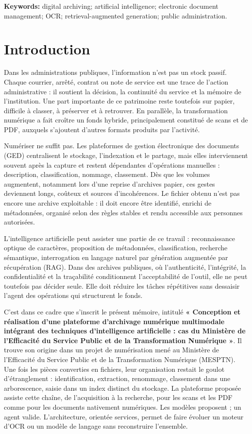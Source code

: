 \documentclass[12pt,a4paper]{report}
\newcommand{\rapportTitre}{Conception et réalisation d'une plateforme d'archivage numérique multimodale intégrant des techniques d'intelligence artificielle : cas du Ministère de l'Efficacité du Service Public et de la Transformation Numérique}
\newcommand{\nomMinistere}{Ministère de l'Efficacité du Service Public et de la Transformation Numérique (MESPTN)}
\begin{document}
\noindent\textbf{Keywords:} digital archiving; artificial intelligence; electronic document management; OCR; retrieval-augmented generation; public administration.
\endgroup

\clearpage
\tableofcontents
\clearpage

\pagestyle{fancy}

\chapter*{Introduction}
Dans les administrations publiques, l'information n'est pas un stock passif. Chaque courrier, arrêté, contrat ou note de service est une trace de l'action administrative : il soutient la décision, la continuité du service et la mémoire de l'institution. Une part importante de ce patrimoine reste toutefois sur papier, difficile à classer, à préserver et à retrouver. En parallèle, la transformation numérique a fait croître un fonds hybride, principalement constitué de scans et de PDF, auxquels s'ajoutent d'autres formats produits par l'activité.

Numériser ne suffit pas. Les plateformes de gestion électronique des documents (GED) centralisent le stockage, l'indexation et le partage, mais elles interviennent souvent après la capture et restent dépendantes d'opérations manuelles : description, classification, nommage, classement. Dès que les volumes augmentent, notamment lors d'une reprise d'archives papier, ces gestes deviennent longs, coûteux et sources d'incohérences. Le fichier obtenu n'est pas encore une archive exploitable : il doit encore être identifié, enrichi de métadonnées, organisé selon des règles stables et rendu accessible aux personnes autorisées.

L'intelligence artificielle peut assister une partie de ce travail : reconnaissance optique de caractères, proposition de métadonnées, classification, recherche sémantique, interrogation en langage naturel par génération augmentée par récupération (RAG). Dans des archives publiques, où l'authenticité, l'intégrité, la confidentialité et la traçabilité conditionnent l'acceptabilité de l'outil, elle ne peut toutefois pas décider seule. Elle doit réduire les tâches répétitives sans dessaisir l'agent des opérations qui structurent le fonds.

C'est dans ce cadre que s'inscrit le présent mémoire, intitulé \textbf{« \rapportTitre{} »}. Il trouve son origine dans un projet de numérisation mené au \nomMinistere{}. Une fois les pièces converties en fichiers, leur organisation restait le goulot d'étranglement : identification, extraction, renommage, classement dans une arborescence, saisie dans un index distinct du stockage. La plateforme proposée assiste cette chaîne, de l'acquisition à la recherche, pour les scans et les PDF comme pour les documents nativement numériques. Les modèles proposent ; un agent valide. L'architecture, orientée services, permet de faire évoluer un moteur d'OCR ou un modèle de langage sans reconstruire l'ensemble.
\end{document}
